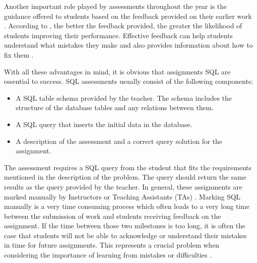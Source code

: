 Another important role played by assessments throughout the year is the guidance offered to students based on the feedback provided on their earlier work \citep{literature:assement}. According to \cite{literature:assement}, the better the feedback provided, the greater the likelihood of students improving their performance. Effective feedback can help students understand what mistakes they make and also provides information about how to fix them \citep{literature:assement}.

With all these advantages in mind, it is obvious that assignments SQL are essential to success. SQL assessments usually consist of the following components:
\begin{itemize}
    \item A SQL table schema provided by the teacher. The schema includes
    the structure of the database tables and any relations between them.
    \item A SQL query that inserts the initial data in the database.
    \item A description of the assessment and a correct query solution for the
    assignment.
\end{itemize}

The assessment requires a SQL query from the student that fits the requirements mentioned in the description of the problem. The query should return the same results as the query provided by the teacher. In general, these assignments are marked manually by Instructors or Teaching Assistants (TAs) \citep{literature:xdata}. Marking SQL manually is a very time consuming process which often leads to a very long time between the submission of work and students receiving feedback on the assignment. If the time between those two milestones is too long, it is often the case that students will not be able to acknowledge or understand their mistakes in time for future assignments. This represents a crucial problem when considering the importance of learning from mistakes or difficulties \citep{literature:assement}.

